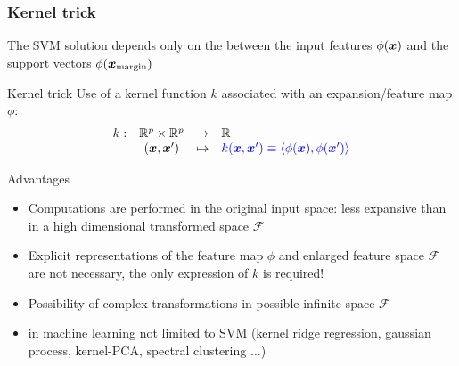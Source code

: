 \begin{frame}
  \frametitle{Kernel trick}

The SVM solution depends only on the  between the input features $\phi({\boldsymbol{x}})$ and the support vectors
  $\phi({\boldsymbol{x}}_{\textrm{margin}})$

  \begin{block}{Kernel trick}
  Use of  a kernel function $k$ associated with an expansion/feature map $\phi$:
  $$\begin{array}{ccll} k:& \mathbb{R}^p \times \mathbb{R}^p  &\rightarrow& \mathbb{R}\\
              & ({\boldsymbol{x}},{\boldsymbol{x}}') &\mapsto& {\textcolor{blue}{ k ({\boldsymbol{x}},{\boldsymbol{x}}') \equiv \langle \phi({\boldsymbol{x}}), \phi({\boldsymbol{x}}') \rangle}}
             \end{array}$$
  \end{block}

 \begin{block}{Advantages}
  \begin{itemize}
   \item Computations are performed in the original input space: less  expansive than in a high
   dimensional transformed space $\mathcal{F}$
   \item Explicit representations of the feature map $\phi$ and enlarged feature space $\mathcal{F}$ are not necessary, the only expression of $k$
   is required!
   \item[\doigt] Possibility of complex transformations in possible infinite space  $\mathcal{F}$
   \item[\doigt]  in machine learning not limited to SVM (kernel ridge regression, gaussian process, kernel-PCA, spectral clustering $\ldots$)
  \end{itemize}

 \end{block}


\end{frame}

